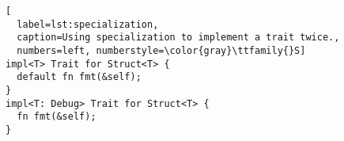 \begin{lstlisting}[
  label=lst:specialization,
  caption=Using specialization to implement a trait twice.,
  numbers=left, numberstyle=\color{gray}\ttfamily{}S]
impl<T> Trait for Struct<T> {
  default fn fmt(&self);
}
impl<T: Debug> Trait for Struct<T> {
  fn fmt(&self);
}
\end{lstlisting}
